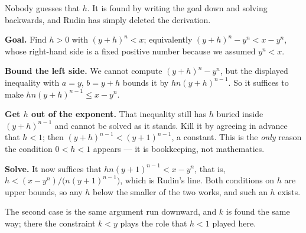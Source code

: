 \begin{unpack}
Nobody guesses that $h$. It is found by writing the goal down and solving
backwards, and Rudin has simply deleted the derivation.

\smallskip
\textbf{Goal.} Find $h>0$ with $(y+h)^n < x$; equivalently
$(y+h)^n - y^n < x - y^n$, whose right-hand side is a fixed positive number
because we assumed $y^n < x$.

\smallskip
\textbf{Bound the left side.} We cannot compute $(y+h)^n - y^n$, but the
displayed inequality with $a = y$, $b = y+h$ bounds it by $hn(y+h)^{n-1}$. So it
suffices to make $hn(y+h)^{n-1} \le x - y^n$.

\smallskip
\textbf{Get $h$ out of the exponent.} That inequality still has $h$ buried
inside $(y+h)^{n-1}$ and cannot be solved as it stands. Kill it by agreeing in
advance that $h < 1$; then $(y+h)^{n-1} < (y+1)^{n-1}$, a constant. This is the
\emph{only} reason the condition $0 < h < 1$ appears --- it is bookkeeping, not
mathematics.

\smallskip
\textbf{Solve.} It now suffices that $hn(y+1)^{n-1} < x - y^n$, that is,
$h < (x-y^n)/\bigl(n(y+1)^{n-1}\bigr)$, which is Rudin's line. Both conditions
on $h$ are upper bounds, so any $h$ below the smaller of the two works, and such
an $h$ exists.

\smallskip
The second case is the same argument run downward, and $k$ is found the same
way; there the constraint $k < y$ plays the role that $h < 1$ played here.

\medskip
\begin{center}
\end{center}
\end{unpack}

